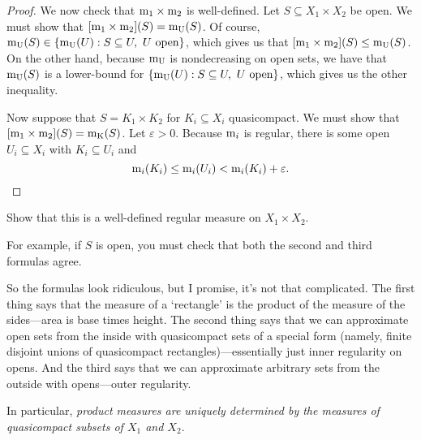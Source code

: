 \begin{dfn}
\begin{prp}
\begin{savenotes}
\begin{proof}
We now check that $\mathrm{m} _1\times \mathrm{m} _2$ is well-defined.  Let $S\subseteq X_1\times X_2$ be open.  We must show that $[\mathrm{m} _1\times \mathrm{m} _2](S)=\mathrm{m} _{\mathrm{U}}(S)$.  Of course, $\mathrm{m} _{\mathrm{U}}(S)\in \{ \mathrm{m} _{\mathrm{U}}(U):S\subseteq U,\ U\text{ open}\}$, which gives us that $[\mathrm{m} _1\times \mathrm{m} _2](S)\leq \mathrm{m} _{\mathrm{U}}(S)$.  On the other hand, because $\mathrm{m} _{\mathrm{U}}$ is nondecreasing on open sets, we have that $\mathrm{m} _{\mathrm{U}}(S)$ is a lower-bound for $\{ \mathrm{m} _{\mathrm{U}}(U):S\subseteq U,\ U\text{ open}\}$, which gives us the other inequality.

Now suppose that $S=K_1\times K_2$ for $K_i\subseteq X_i$ quasicompact.  We must show that $[\mathrm{m} _1\times \mathrm{m} _2](S)=\mathrm{m} _{\mathrm{K}}(S)$.  Let $\varepsilon >0$.  Because $\mathrm{m} _i$ is regular, there is some open $U_i\subseteq X_i$ with $K_i\subseteq U_i$ and
\begin{equation}
\mathrm{m} _i(K_i)\leq \mathrm{m} _i(U_i)<\mathrm{m} _i(K_i)+\varepsilon .
\end{equation}
\end{proof}
\end{savenotes}
\end{prp}
\begin{exr}\label{exr5.2.4}
Show that this is a well-defined regular measure on $X_1\times X_2$.
\begin{rmk}
For example, if $S$ is open, you must check that both the second and third formulas agree.
\end{rmk}
\end{exr}
\begin{rmk}
So the formulas look ridiculous, but I promise, it's not that complicated.  The first thing says that the measure of a `rectangle' is the product of the measure of the sides---area is base times height.  The second thing says that we can approximate open sets from the inside with quasicompact sets of a special form (namely, finite disjoint unions of quasicompact rectangles)---essentially just inner regularity on opens.  And the third says that we can approximate arbitrary sets from the outside with opens---outer regularity.
\end{rmk}
\begin{rmk}
In particular, \emph{product measures are uniquely determined by the measures of quasicompact subsets of $X_1$ and $X_2$}.
\end{rmk}
\end{dfn}
